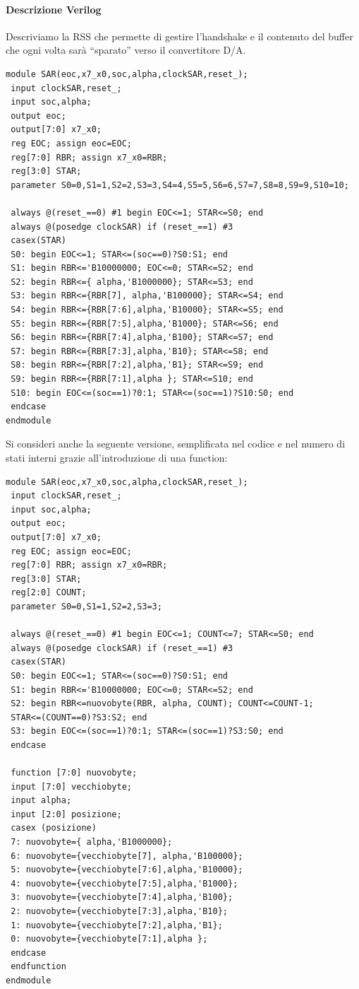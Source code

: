 \documentclass[11pt]{report}
\begin{document}
\paragraph{Descrizione Verilog} Descriviamo la RSS che permette di gestire l'handshake e il contenuto del buffer che ogni volta sarà ``sparato'' verso il convertitore D/A.
\begin{verbatim}
module SAR(eoc,x7_x0,soc,alpha,clockSAR,reset_);
 input clockSAR,reset_;
 input soc,alpha;
 output eoc;
 output[7:0] x7_x0;
 reg EOC; assign eoc=EOC;
 reg[7:0] RBR; assign x7_x0=RBR;
 reg[3:0] STAR;
 parameter S0=0,S1=1,S2=2,S3=3,S4=4,S5=5,S6=6,S7=7,S8=8,S9=9,S10=10;
 
 always @(reset_==0) #1 begin EOC<=1; STAR<=S0; end
 always @(posedge clockSAR) if (reset_==1) #3
 casex(STAR)
 S0: begin EOC<=1; STAR<=(soc==0)?S0:S1; end
 S1: begin RBR<='B10000000; EOC<=0; STAR<=S2; end
 S2: begin RBR<={ alpha,'B1000000}; STAR<=S3; end
 S3: begin RBR<={RBR[7], alpha,'B100000}; STAR<=S4; end
 S4: begin RBR<={RBR[7:6],alpha,'B10000}; STAR<=S5; end
 S5: begin RBR<={RBR[7:5],alpha,'B1000}; STAR<=S6; end
 S6: begin RBR<={RBR[7:4],alpha,'B100}; STAR<=S7; end
 S7: begin RBR<={RBR[7:3],alpha,'B10}; STAR<=S8; end
 S8: begin RBR<={RBR[7:2],alpha,'B1}; STAR<=S9; end
 S9: begin RBR<={RBR[7:1],alpha }; STAR<=S10; end
 S10: begin EOC<=(soc==1)?0:1; STAR<=(soc==1)?S10:S0; end
 endcase
endmodule
\end{verbatim}
Si consideri anche la seguente versione, semplificata nel codice e nel numero di stati interni grazie all'introduzione di una function:
\begin{verbatim}
module SAR(eoc,x7_x0,soc,alpha,clockSAR,reset_);
 input clockSAR,reset_;
 input soc,alpha;
 output eoc;
 output[7:0] x7_x0;
 reg EOC; assign eoc=EOC;
 reg[7:0] RBR; assign x7_x0=RBR;
 reg[3:0] STAR;
 reg[2:0] COUNT;
 parameter S0=0,S1=1,S2=2,S3=3;
 
 always @(reset_==0) #1 begin EOC<=1; COUNT<=7; STAR<=S0; end
 always @(posedge clockSAR) if (reset_==1) #3
 casex(STAR)
 S0: begin EOC<=1; STAR<=(soc==0)?S0:S1; end
 S1: begin RBR<='B10000000; EOC<=0; STAR<=S2; end
 S2: begin RBR<=nuovobyte(RBR, alpha, COUNT); COUNT<=COUNT-1;
 STAR<=(COUNT==0)?S3:S2; end
 S3: begin EOC<=(soc==1)?0:1; STAR<=(soc==1)?S3:S0; end
 endcase
 
 function [7:0] nuovobyte;
 input [7:0] vecchiobyte;
 input alpha;
 input [2:0] posizione;
 casex (posizione)
 7: nuovobyte={ alpha,'B1000000};
 6: nuovobyte={vecchiobyte[7], alpha,'B100000};
 5: nuovobyte={vecchiobyte[7:6],alpha,'B10000};
 4: nuovobyte={vecchiobyte[7:5],alpha,'B1000};
 3: nuovobyte={vecchiobyte[7:4],alpha,'B100};
 2: nuovobyte={vecchiobyte[7:3],alpha,'B10};
 1: nuovobyte={vecchiobyte[7:2],alpha,'B1};
 0: nuovobyte={vecchiobyte[7:1],alpha };
 endcase
 endfunction
endmodule\end{verbatim}
\end{document}
